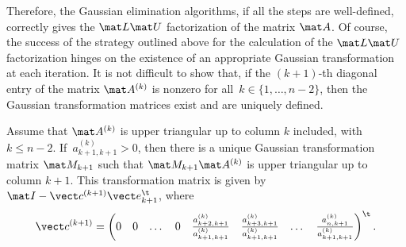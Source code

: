 Therefore, the Gaussian elimination algorithms, if all the steps are well-defined,
correctly gives the $\mat L \mat U$ factorization of the matrix $\mat A$.
Of course, the success of the strategy outlined above for the calculation of the $\mat L \mat U$ factorization hinges on
the existence of an appropriate Gaussian transformation at each iteration.
It is not difficult to show that,
if the $(k+1)$-th diagonal entry of the matrix $\mat A^{(k)}$ is nonzero for all~$k \in \{1, \dotsc, n-2\}$,
then the Gaussian transformation matrices exist and are uniquely defined.
\begin{lemma}
    \label{lemma:linear_expression_gaussian_transformations}
    Assume that $\mat A^{(k)}$ is upper triangular up to column $k$ included,
    with $k \leq n-2$.
    If~$a^{(k)}_{k+1,k+1} > 0$,
    then there is a unique Gaussian transformation matrix $\mat M_{k+1}$ such that $\mat M_{k+1} \mat A^{(k)}$ is upper triangular up to column $k + 1$.
    This transformation matrix is given by $\mat I - \vect c^{(k+1)} \vect e_{k+1}^\t$, where
    \[
        \vect c^{(k+1)} =
        \begin{pmatrix}
            0 & 0 & \dots & 0 & \frac{a^{(k)}_{k+2,k+1}}{a^{(k)}_{k+1,k+1}} & \frac{a^{(k)}_{k+3,k+1}}{a^{(k)}_{k+1,k+1}} & \dots & \frac{a^{(k)}_{n,k+1}}{a^{(k)}_{k+1,k+1}}
        \end{pmatrix}^\t.
    \]
\end{lemma}
